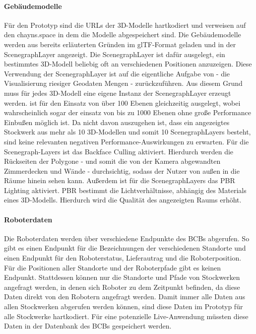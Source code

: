 \paragraph{Gebäudemodelle}
Für den Prototyp sind die \ac{URL}s der 3D-Modelle hartkodiert und verweisen auf den chayns.space in dem die Modelle abgespeichert sind. Die Gebäudemodelle werden aus bereits erläuterten Gründen im \ac{glTF}-Format geladen und in der ScenegraphLayer angezeigt. Die ScenegraphLayer ist dafür ausgelegt, ein bestimmtes 3D-Modell beliebig oft an verschiedenen Positionen anzuzeigen. Diese Verwendung der ScenegraphLayer ist auf die eigentliche Aufgabe von \deckgl{} - die Visualisierung riesiger Geodaten Mengen - zurückzuführen. Aus diesem Grund muss für jedes 3D-Modell eine eigene Instanz der ScenegraphLayer erzeugt werden. 
\deckgl{} ist für den Einsatz von über 100 Ebenen gleichzeitig ausgelegt, wobei wahrscheinlich sogar der einsatz von bis zu 1000 Ebenen ohne große Performance Einbußen möglich ist. Da nicht davon auszugehen ist, dass ein angezeigtes Stockwerk aus mehr als 10 3D-Modellen und somit 10 ScenegraphLayers besteht, sind keine relevanten negativen Performance-Auswirkungen zu erwarten.
Für die Scenegraph-Layers ist das Backface Culling aktiviert. Hierdurch werden die Rückseiten der Polygone - und somit die von der Kamera abgewandten Zimmerdecken und Wände - durchsichtig, sodass der Nutzer von außen in die Räume hinein sehen kann. 
Außerdem ist für die ScenegraphLayers das \ac{PBR} Lighting aktiviert. \ac{PBR} bestimmt die Lichtverhältnisse, abhängig des Materials eines 3D-Modells. Hierdurch wird die Qualität des angezeigten Raums erhöht.

\paragraph{Roboterdaten}
Die Roboterdaten werden über verschiedene Endpunkte des \ac{BCB}s abgerufen. So gibt es einen Endpunkt für die Bezeichnungen der verschiedenen Standorte und einen Endpunkt für den Roboterstatus, Lieferautrag und die Roboterposition.
Für die Positionen aller Standorte und der Roboterpfade gibt es keinen Endpunkt. Stattdessen können nur die Standorte und Pfade von Stockwerken angefragt werden, in denen sich Roboter zu dem Zeitpunkt befinden, da diese Daten direkt von den Robotern angefragt werden. Damit immer alle Daten aus allen Stockwerken abgerufen werden können, sind diese Daten im Prototyp für alle Stockwerke hartkodiert. Für eine potenzielle Live-Anwendung müssten diese Daten in der Datenbank des \ac{BCB}s gespeichert werden.


